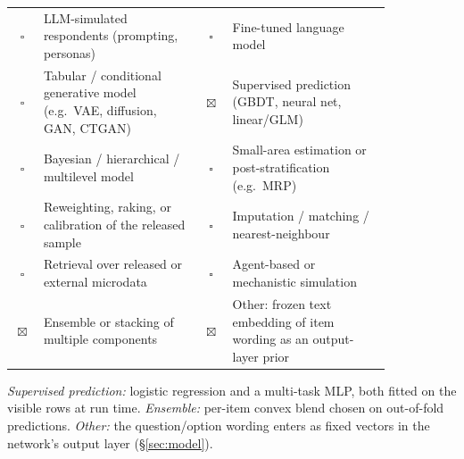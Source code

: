 \documentclass{article}
\newcommand{\cbox}{$\square$}
\newcommand{\cboxchecked}{$\boxtimes$}
\begin{document}
\begin{table}[h]
  \centering
  \small
  \begin{tabular}{@{}cp{0.42\linewidth}cp{0.42\linewidth}@{}}
    \toprule
    \cbox & LLM-simulated respondents (prompting, personas) & \cbox & Fine-tuned language model \\
    \cbox & Tabular / conditional generative model (e.g.\ VAE, diffusion, GAN, CTGAN) & \cboxchecked & Supervised prediction (GBDT, neural net, linear/GLM) \\
    \cbox & Bayesian / hierarchical / multilevel model & \cbox & Small-area estimation or post-stratification (e.g.\ MRP) \\
    \cbox & Reweighting, raking, or calibration of the released sample & \cbox & Imputation / matching / nearest-neighbour \\
    \cbox & Retrieval over released or external microdata & \cbox & Agent-based or mechanistic simulation \\
    \cboxchecked & Ensemble or stacking of multiple components & \cboxchecked & Other: frozen text embedding of item wording as an output-layer prior \\
    \bottomrule
  \end{tabular}
\end{table}

\emph{Supervised prediction:} logistic regression and a multi-task MLP, both fitted on the visible rows at run time. \emph{Ensemble:} per-item convex blend chosen on out-of-fold predictions. \emph{Other:} the question/option wording enters as fixed vectors in the network's output layer (\S\ref{sec:model}).
\end{document}
